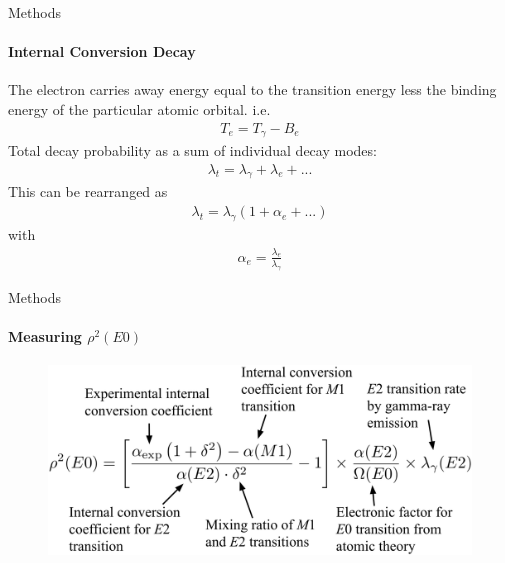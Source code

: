 \documentclass{beamer}
\begin{document}


\begin{frame}{Methods}
\framesubtitle{Internal Conversion Decay}
The electron carries away energy equal to the transition energy less the binding energy of the particular atomic orbital. i.e.
\begin{gather*}
T_e = T_\gamma - B_e
\label{iceEnergy}
\end{gather*}
Total decay probability as a sum of individual decay modes:
\begin{gather*}
\lambda_t = \lambda_\gamma + \lambda_e + ...
\end{gather*}
This can be rearranged as
\begin{gather*}
\lambda_t = \lambda_\gamma(1+\alpha_e + ...)
\end{gather*}
with
\begin{gather*}
 \alpha_e=\frac{\lambda_e}{\lambda_\gamma}
\end{gather*}
\end{frame}



\begin{frame}{Methods}
\framesubtitle{Measuring $\rho^2(E0)$}
\begin{figure}[!hht]
  \centering
  \includegraphics[width=\textwidth, keepaspectratio]{E0strengthDisambig.png}
\end{figure}
\end{frame}


\end{document}
